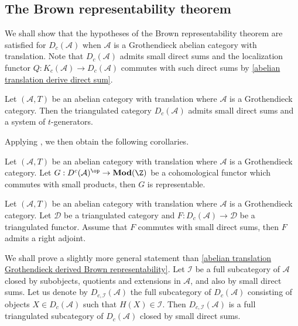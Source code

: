 \subsection{The Brown representability theorem}
We shall show that the hypotheses of the Brown representability theorem are satisfied for $D_c(\mathcal{A})$ when $\mathcal{A}$ is a Grothendieck abelian category with translation. Note that $D_c(\mathcal{A})$ admits small direct sums and the localization functor $Q:K_c(\mathcal{A})\to D_c(\mathcal{A})$ commutes with such direct sums by \cref{abelian translation derive direct sum}.
\begin{theorem}\label{abelian translation Grothendieck derived Brown representability}
Let $(\mathcal{A},T)$ be an abelian category with translation where $\mathcal{A}$ is a Grothendieck category. Then the triangulated category $D_c(\mathcal{A})$ admits small direct sums and a system of $t$-generators.
\end{theorem}
Applying \cite[corollary 10.5.2 and corollary 10.5.3]{kashiwara_SAC}, we then obtain the following corollaries.
\begin{corollary}\label{abelian translation Grothendieck derived presheaf representable if}
Let $(\mathcal{A},T)$ be an abelian category with translation where $\mathcal{A}$ is a Grothendieck category. Let $G:D^c(\mathcal{A})^{\op}\to\mathbf{Mod}(\Z)$ be a cohomological functor which commutes with small products, then $G$ is representable.
\end{corollary}
\begin{corollary}\label{abelian translation Grothendieck derived triangulated functor adjoint if}
Let $(\mathcal{A},T)$ be an abelian category with translation where $\mathcal{A}$ is a Grothendieck category. Let $\mathcal{D}$ be a triangulated category and $F:D_c(\mathcal{A})\to\mathcal{D}$ be a triangulated functor. Assume that $F$ commutes with small direct sums, then $F$ admits a right adjoint.
\end{corollary}

We shall prove a slightly more general statement than \cref{abelian translation Grothendieck derived Brown representability}. Let $\mathcal{I}$ be a full subcategory of $\mathcal{A}$ closed by subobjects, quotients and extensions in $\mathcal{A}$, and also by small direct sums. Let us denote by $D_{c,\mathcal{I}}(\mathcal{A})$ the full subcategory of $D_c(\mathcal{A})$ consisting of objects $X\in D_c(\mathcal{A})$ such that $H(X)\in\mathcal{I}$. Then $D_{c,\mathcal{I}}(\mathcal{A})$ is a full triangulated subcategory of $D_c(\mathcal{A})$ closed by small direct sums.

